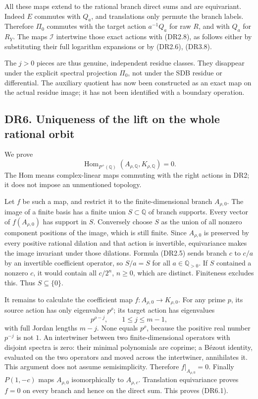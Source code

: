 All these maps extend to the rational branch direct sums and are
equivariant. Indeed \(E\) commutes with \(Q_a\), and translations only
permute the branch labels. Therefore \(\Pi_0\) commutes with the target
action \(a^{-1}Q_a\) for raw \(R\), and with \(Q_a\) for \(R_Y\). The
maps \(\mathscr I\) intertwine those exact actions with (DR2.8), as
follows either by substituting their full logarithm expansions or by
(DR2.6), (DR3.8).

The \(j>0\) pieces are thus genuine, independent residue classes. They
disappear under the explicit spectral projection \(\Pi_0\), not under
the SDB residue or differential. The auxiliary quotient has now been
constructed as an exact map on the actual residue image; it has not been
identified with a boundary operation.

\subsection{DR6. Uniqueness of the lift on the whole rational
orbit}\label{dr6.-uniqueness-of-the-lift-on-the-whole-rational-orbit}

We prove \[
 \operatorname{Hom}_{P^+(\mathbb Q)}
       (A_{\rho,\mathbb Q},K_{\rho,\mathbb Q})=0.
\tag{DR6.1}
\] The Hom means complex-linear maps commuting with the right actions in
DR2; it does not impose an unmentioned topology.

Let \(f\) be such a map, and restrict it to the finite-dimensional
branch \(A_{\rho,0}\). The image of a finite basis has a finite union
\(S\subset\mathbb Q\) of branch supports. Every vector of
\(f(A_{\rho,0})\) has support in \(S\). Conversely choose \(S\) as the
union of all nonzero component positions of the image, which is still
finite. Since \(A_{\rho,0}\) is preserved by every positive rational
dilation and that action is invertible, equivariance makes the image
invariant under those dilations. Formula (DR2.5) sends branch \(c\) to
\(c/a\) by an invertible coefficient operator, so \(S/a=S\) for all
\(a\in\mathbb Q_{>0}\). If \(S\) contained a nonzero \(c\), it would
contain all \(c/2^n\), \(n\ge0\), which are distinct. Finiteness
excludes this. Thus \(S\subseteq\{0\}\).

It remains to calculate the coefficient map
\(f:A_{\rho,0}\to K_{\rho,0}\). For any prime \(p\), its source action
has only eigenvalue \(p^\rho\); its target action has eigenvalues \[
 p^{\rho-j},\qquad 1\le j\le m-1,
\tag{DR6.2}
\] with full Jordan lengths \(m-j\). None equals \(p^\rho\), because the
positive real number \(p^{-j}\) is not \(1\). An intertwiner between two
finite-dimensional operators with disjoint spectra is zero: their
minimal polynomials are coprime; a Bézout identity, evaluated on the two
operators and moved across the intertwiner, annihilates it. This
argument does not assume semisimplicity. Therefore
\(f|_{A_{\rho,0}}=0\). Finally \(P(1,-c)\) maps \(A_{\rho,0}\)
isomorphically to \(A_{\rho,c}\). Translation equivariance proves
\(f=0\) on every branch and hence on the direct sum. This proves
(DR6.1).


